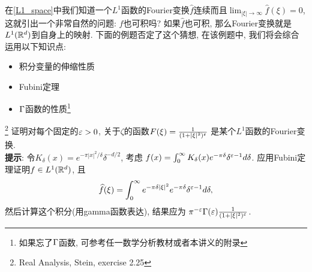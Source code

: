 在\ref{L1_space}中我们知道一个$L^1$函数的Fourier变换$\hat{f}$连续而且$\lim_{|\xi|\to \infty}\hat{f}(\xi) = 0$, 这就引出一个非常自然的问题: $\hat{f}$也可积吗? 如果$\hat{f}$也可积, 那么Fourier变换就是$L^1(\mathbb{R}^d)$到自身上的映射. 下面的例题否定了这个猜想, 在该例题中, 我们将会综合运用以下知识点:
\begin{itemize}
    \item 积分变量的伸缩性质
    \item Fubini定理
    \item $\Gamma$函数的性质\footnote{如果忘了$\Gamma$函数, 可参考任一数学分析教材或者本讲义的附录}
    
\end{itemize}
\begin{example}\footnote{Real Analysis, Stein, exercise 2.25}
    {\everymath{\displaystyle}
    证明对每个固定的$\varepsilon > 0$, 关于$\zeta$的函数$F(\xi)=\frac{1}{(1+|\xi|^2)^\varepsilon}$
    是某个$L^1$函数的Fourier变换. \\
    \textbf{提示}: 令$K_\delta(x)=e^{-\pi|x|^2/\delta} \delta^{-d/2}$, 考虑
    $f(x)=\int_0^\infty K_\delta(x)e^{-\pi \delta}\delta^{\varepsilon-1} d\delta$. 
    应用Fubini定理证明$f \in L^1(\mathbb{R}^d)$, 且$$\widehat{f}(\xi) = \int_0^\infty e^{-\pi \delta |\xi|^2} e^{-\pi \delta} \delta^{\varepsilon-1} d\delta, $$
    然后计算这个积分(用gamma函数表达), 结果应为
    $\pi^{-\varepsilon}\Gamma(\varepsilon)\frac{1}{(1+|\xi|^2)^\varepsilon}$.
    }
\end{example}
